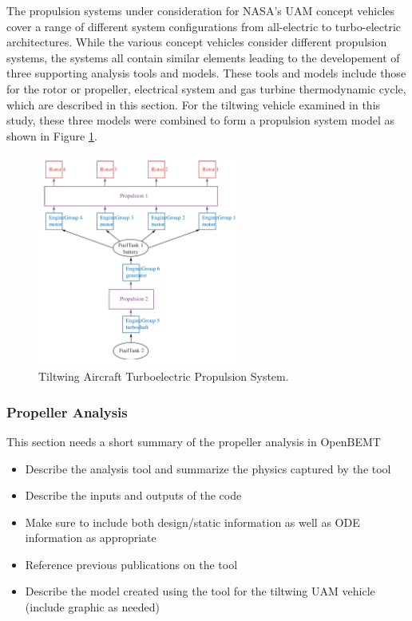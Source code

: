 
The propulsion systems under consideration for NASA's UAM concept vehicles cover a range of different system configurations from all-electric to turbo-electric architectures.
While the various concept vehicles consider different propulsion systems, the systems all contain similar elements leading to the developement of three supporting analysis tools and models.
These tools and models include those for the rotor or propeller, electrical system and gas turbine thermodynamic cycle, which are described in this section.  
For the tiltwing vehicle examined in this study, these three models were combined to form a propulsion system model as shown in Figure \ref{f:turboelectric}. 

\begin{figure}
\begin{center}
 \includegraphics[width=0.6\textwidth]{../Images/Turboelectric.pdf}
 \caption{Tiltwing Aircraft Turboelectric Propulsion System.\cite{johnson2018concept}}
 \label{f:turboelectric}
\end{center}
\end{figure}

\subsubsection{Propeller Analysis} %
This section needs a short summary of the propeller analysis in OpenBEMT
\begin{itemize}
    \item Describe the analysis tool and summarize the physics captured by the tool
    \item Describe the inputs and outputs of the code
    \item Make sure to include both design/static information as well as ODE information as appropriate
    \item Reference previous publications on the tool
    \item Describe the model created using the tool for the tiltwing UAM vehicle (include graphic as needed)
\end{itemize}

